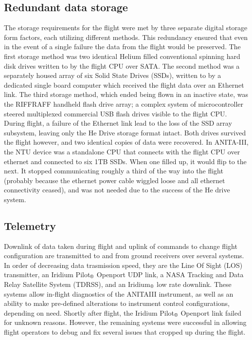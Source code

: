 	\subsection{Redundant data storage}
		The storage requirements for the flight were met by three separate digital storage form factors, each utilizing different methods.  This redundancy ensured that even in the event of a single failure the data from the flight would be preserved.  The first storage method was two identical Helium filled conventional spinning hard disk drives written to by the flight CPU over SATA.  The second method was a separately housed array of six Solid State Drives (SSDs), written to by a dedicated single board computer which received the flight data over an Ethernet link.  The third storage method, which ended being flown in an inactive state, was the RIFFRAFF handheld flash drive array; a complex system of microcontroller steered multiplexed commercial USB flash drives visible to the flight CPU.  During flight, a failure of the Ethernet link lead to the loss of the SSD array subsystem, leaving only the He Drive storage format intact.  Both drives survived the flight however, and two identical copies of data were recovered.
		In ANITA-III, the NTU device was a standalone CPU that connects with the flight CPU over ethernet and connected to six 1TB SSDs.  When one filled up, it would flip to the next.  It stopped communicating roughly a third of the way into the flight (probably because the ethernet power cable wiggled loose and all ethernet connectivity ceased), and was not needed due to the success of the He drive system.
		
	
	\subsection{Telemetry}
		Downlink of data taken during flight and uplink of commands to change flight configuration are transmitted to and from ground receivers over several systems.  In order of decreasing data trasmission speed, they are the Line Of Sight (LOS) transmitter, an Iridium Pilot$_{\text{\textregistered}}$ Openport UDP link, a NASA Tracking and Data Relay Satellite System (TDRSS), and an Iridium$_{\text{\textregistered}}$ low rate downlink.  These systems allow in-flight diagnostics of the ANITAIII instrument, as well as an ability to make pre-defined alterations to instrument control configurations, depending on need.  Shortly after flight, the Iridium Pilot$_{\text{\textregistered}}$ Openport link failed for unknown reasons.  However, the remaining systems were successful in allowing flight operators to debug and fix several issues that cropped up during the flight.  %
		
